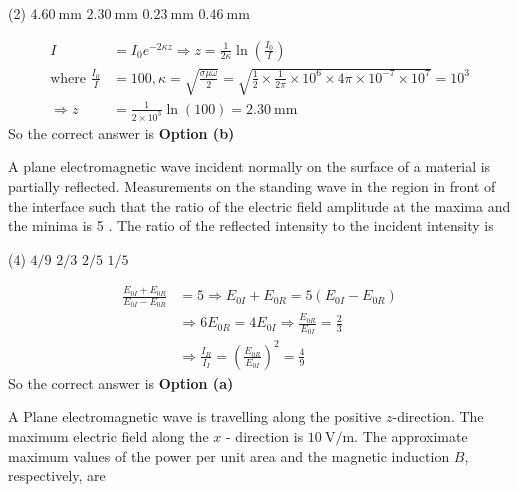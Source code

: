 \begin{enumerate}
\begin{minipage}{\textwidth}
	\end{minipage}
	\begin{tasks}(2)
		\task[\textbf{a.}] $4.60 \mathrm{~mm}$
		\task[\textbf{b.}]$2.30 \mathrm{~mm}$
		\task[\textbf{c.}] $0.23 \mathrm{~mm}$
		\task[\textbf{d.}]$0.46 \mathrm{~mm}$
	\end{tasks}
\begin{answer}
	\begin{align*}
	I&=I_{0} e^{-2 \kappa z} \Rightarrow z=\frac{1}{2 \kappa} \ln \left(\frac{I_{0}}{I}\right)\\
	\text{where }\frac{I_{0}}{I}&=100, \kappa=\sqrt{\frac{\sigma \mu \omega}{2}}=\sqrt{\frac{1}{2} \times \frac{1}{2 \pi} \times 10^{6} \times 4 \pi \times 10^{-7} \times 10^{7}}=10^{3}\\
	\Rightarrow z&=\frac{1}{2 \times 10^{3}} \ln (100)=2.30 \mathrm{~mm}
	\end{align*}
	So the correct answer is \textbf{Option (b)}
\end{answer}
	\begin{minipage}{\textwidth}
		\item A plane electromagnetic wave incident normally on the surface of a material is partially reflected. Measurements on the standing wave in the region in front of the interface such that the ratio of the electric field amplitude at the maxima and the minima is 5 . The ratio of the reflected intensity to the incident intensity is
	\end{minipage}
	\begin{tasks}(4)
		\task[\textbf{a.}] $4 / 9$
		\task[\textbf{b.}] $2 / 3$
		\task[\textbf{c.}]$2 / 5$
		\task[\textbf{d.}]$1 / 5$
	\end{tasks}
\begin{answer}
	\begin{align*}
	\frac{E_{0 I}+E_{0 R}}{E_{0 I}-E_{0 R}}&=5 \Rightarrow E_{0 I}+E_{0 R}=5\left(E_{0 I}-E_{0 R}\right) \\&\Rightarrow 6 E_{0 R}=4 E_{0 I} \Rightarrow \frac{E_{0 R}}{E_{0 I}}=\frac{2}{3}\\
	&\Rightarrow \frac{I_{R}}{I_{I}}=\left(\frac{E_{0 R}}{E_{0 I}}\right)^{2}=\frac{4}{9}
	\end{align*}
	So the correct answer is \textbf{Option (a)}
\end{answer}
	\begin{minipage}{\textwidth}
		\item A Plane electromagnetic wave is travelling along the positive $z$-direction. The maximum electric field along the $x$ - direction is $10 \mathrm{~V} / \mathrm{m}$. The approximate maximum values of the power per unit area and the magnetic induction $B$, respectively, are

\end{minipage}
\end{enumerate}
